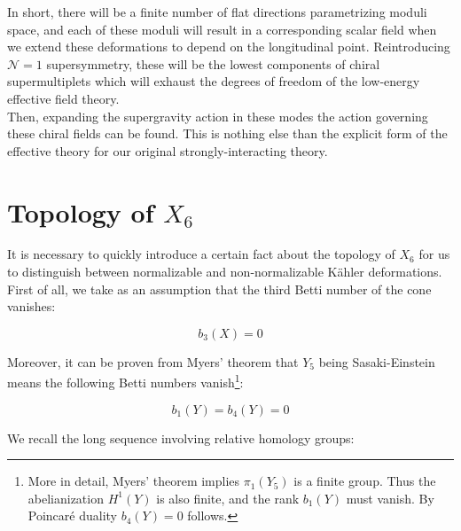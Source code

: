 In short, there will be a finite number of flat directions parametrizing moduli space, and each of these moduli will result in a corresponding scalar field when we extend these deformations to depend on the longitudinal point. Reintroducing $\mathcal{N}=1$ supersymmetry, these will be the lowest components of chiral supermultiplets which will exhaust the degrees of freedom of the low-energy effective field theory.\\

Then, expanding the supergravity action in these modes the action governing these chiral fields can be found. This is nothing else than the explicit form of the effective theory for our original strongly-interacting theory.

\section{Topology of $X_6$}

It is necessary to quickly introduce a certain fact about the topology of $X_6$ for us to distinguish between normalizable and non-normalizable K\"ahler deformations. First of all, we take as an assumption that the third Betti number of the cone vanishes:

\begin{equation}
	b_3(X) = 0 \label{bettiX3}
\end{equation}

Moreover, it can be proven\cite{sasakieinstein} from Myers' theorem\cite{myers1941} that $Y_5$ being Sasaki-Einstein means the following Betti numbers vanish\footnote{More in detail, Myers' theorem implies $\pi_1(Y_5)$ is a finite group. Thus the abelianization $H^1(Y)$ is also finite, and the rank $b_1(Y)$ must vanish. By Poincar\'e duality $b_4(Y)=0$ follows.}:

\begin{equation}
	b_1(Y) = b_4(Y) = 0 \label{bettiY14}
\end{equation}




We recall the long sequence involving relative homology groups:

